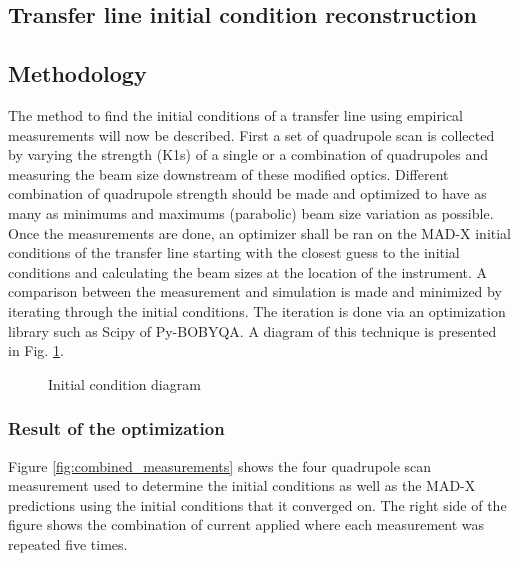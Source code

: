\subsection{Transfer line initial condition reconstruction}


\subsection{Methodology}
The method to find the initial conditions of a transfer line using empirical measurements will now be described. First a set of quadrupole scan is collected by varying the strength (K1s) of a single or a combination of quadrupoles and measuring the beam size downstream of these modified optics. Different combination of quadrupole strength should be made and optimized to have as many as minimums and maximums (parabolic) beam size variation as possible. Once the measurements are done, an optimizer shall be ran on the MAD-X initial conditions of the transfer line starting with the closest guess to the initial conditions and calculating the beam sizes at the location of the instrument. A comparison between the measurement and simulation is made and minimized by iterating through the initial conditions. The iteration is done via an optimization library such as Scipy of Py-BOBYQA. A diagram of this technique is presented in Fig. \ref{fig:initial_condition_diagram}.
\\
\begin{figure}
    \centering
    \scalebox{0.8}{}
    \caption{Initial condition diagram}
    \label{fig:initial_condition_diagram}
\end{figure}

\subsubsection{Result of the optimization}

Figure \ref{fig:combined_measurements} shows the four quadrupole scan measurement used to determine the initial conditions as well as the MAD-X predictions using the initial conditions that it converged on. The right side of the figure shows the combination of current applied where each measurement was repeated five times.
\\

